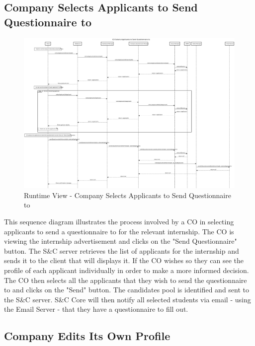 
\subsection{Company Selects Applicants to Send Questionnaire to}
\label{sub:company-selects-applicants-to-send-questionnaire-to}%

\begin{figure}[H]
      \centering
      \includegraphics[width=1.0\textwidth]{Images/RV_08.pdf}
      \caption{Runtime View - Company Selects Applicants to Send Questionnaire to}
      \label{fig:rv-co-selects-applicants}
\end{figure}

\par This sequence diagram illustrates the process involved by a CO in selecting applicants to send a questionnaire to
for the relevant internship. The CO is viewing the internship advertisement and clicks on the "Send Questionnaire"
button. The S\&C server retrieves the list of applicants for the internship and sends it to the client that will
displays it. If the CO wishes so they can see the profile of each applicant individually in order to make a more
informed decision. The CO then selects all the applicants that they wish to send the questionnaire to and clicks on
the "Send" button. The candidates pool is identified and sent to the S\&C server. S\&C Core will then notify all
selected students via email - using the Email Server - that they have a questionnaire to fill out.


\subsection{Company Edits Its Own Profile}
\label{sub:company-edits-its-own-profile}%

